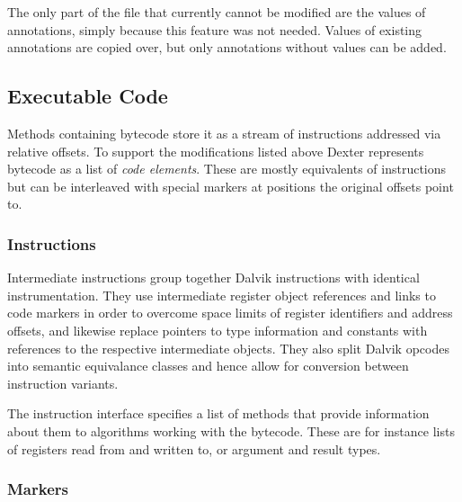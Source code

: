 \documentclass[12pt,twoside,notitlepage]{report}
\begin{document}
The only part of the file that currently cannot be modified are the values of annotations, simply because this feature was not needed. Values of existing annotations are copied over, but only annotations without values can be added.

\subsection{Executable Code}

Methods containing bytecode store it as a stream of instructions addressed via relative offsets. To support the modifications listed above Dexter represents bytecode as a list of \emph{code elements}. These are mostly equivalents of instructions but can be interleaved with special markers at positions the original offsets point to.

\subsubsection{Instructions}

Intermediate instructions group together Dalvik instructions with identical instrumentation. They use intermediate register object references and links to code markers in order to overcome space limits of register identifiers and address offsets, and likewise replace pointers to type information and constants with references to the respective intermediate objects. They also split Dalvik opcodes into semantic equivalance classes and hence allow for conversion between instruction variants.

The instruction interface specifies a list of methods that provide information about them to algorithms working with the bytecode. These are for instance lists of registers read from and written to, or argument and result types.

\subsubsection{Markers}
\end{document}
